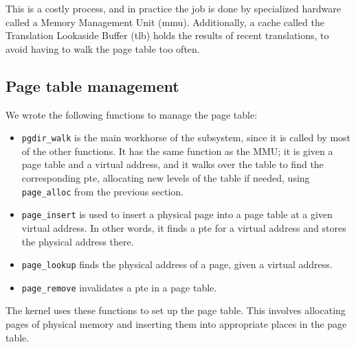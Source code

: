 \documentclass{article}
\begin{document}
This is a costly process, and in practice the job is done by specialized
hardware called a Memory Management Unit (\gls{mmu}). Additionally, a cache
called the Translation Lookaside Buffer (\gls{tlb}) holds the results of
recent translations, to avoid having to walk the page table too often.


\subsection{Page table management}
\label{sec:pagetables}
We wrote the following functions to manage the page table:
\begin{itemize}
\item \texttt{pgdir\_walk} is the main workhorse of the subsystem, since it is
called by most of the other functions. It has the same function as the MMU; it
is given a page table and a virtual address, and it walks over the table to
find the corresponding \gls{pte}, allocating new levels of the table if needed,
using \texttt{page\_alloc} from the previous section.
\item \texttt{page\_insert} is used to insert a physical page into a page
table at a given virtual address. In other words, it finds a \gls{pte} for a virtual
address and stores the physical address there.
\item \texttt{page\_lookup} finds the physical address of a page, given a
virtual address.
\item \texttt{page\_remove} invalidates a \gls{pte} in a page table.
\end{itemize}
The kernel uses these functions to set up the page table. This involves
allocating pages of physical memory and inserting them into appropriate places
in the page table. 
\end{document}
